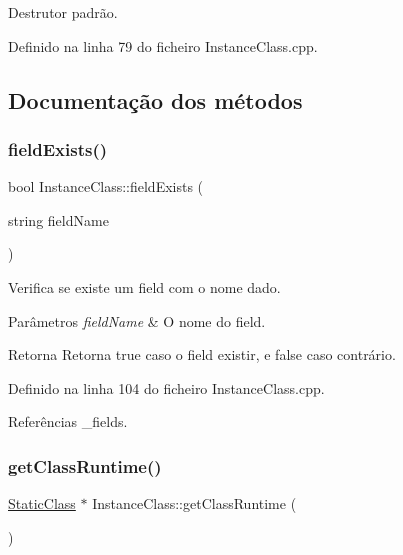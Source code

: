 Destrutor padrão. 



Definido na linha 79 do ficheiro Instance\+Class.\+cpp.



\subsection{Documentação dos métodos}
\mbox{\label{classInstanceClass_a284c7d0a062623c614a2f9440340070f}} 
\subsubsection{\texorpdfstring{field\+Exists()}{fieldExists()}}
{\footnotesize\ttfamily bool Instance\+Class\+::field\+Exists (\begin{DoxyParamCaption}\item[{string}]{field\+Name }\end{DoxyParamCaption})}



Verifica se existe um field com o nome dado. 


\begin{DoxyParams}{Parâmetros}
{\em field\+Name} & O nome do field. \\
\hline
\end{DoxyParams}
\begin{DoxyReturn}{Retorna}
Retorna {\ttfamily true} caso o field existir, e {\ttfamily false} caso contrário. 
\end{DoxyReturn}


Definido na linha 104 do ficheiro Instance\+Class.\+cpp.



Referências \+\_\+fields.

\mbox{\label{classInstanceClass_adf2af3015bb8f777a3181d85aa279de8}} 
\subsubsection{\texorpdfstring{get\+Class\+Runtime()}{getClassRuntime()}}
{\footnotesize\ttfamily \hyperlink{classStaticClass}{Static\+Class} $\ast$ Instance\+Class\+::get\+Class\+Runtime (\begin{DoxyParamCaption}{ }\end{DoxyParamCaption})}



